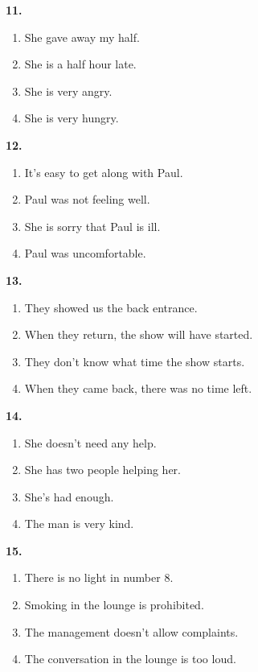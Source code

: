 \documentclass[12pt]{article}
\begin{document}
\par
\vspace{0.25\baselineskip}
\noindent\textbf{11.}
\begin{enumerate}[label=(\Alph*),leftmargin=*,itemsep=0.2em]
\item She gave away my half.
\item She is a half hour late.
\item She is very angry.
\item She is very hungry.
\end{enumerate}
\par
\vspace{0.25\baselineskip}
\noindent\textbf{12.}
\begin{enumerate}[label=(\Alph*),leftmargin=*,itemsep=0.2em]
\item It's easy to get along with Paul.
\item Paul was not feeling well.
\item She is sorry that Paul is ill.
\item Paul was uncomfortable.
\end{enumerate}
\par
\vspace{0.25\baselineskip}
\noindent\textbf{13.}
\begin{enumerate}[label=(\Alph*),leftmargin=*,itemsep=0.2em]
\item They showed us the back entrance.
\item When they return, the show will have started.
\item They don't know what time the show starts.
\item When they came back, there was no time left.
\end{enumerate}
\par
\vspace{0.25\baselineskip}
\noindent\textbf{14.}
\begin{enumerate}[label=(\Alph*),leftmargin=*,itemsep=0.2em]
\item She doesn't need any help.
\item She has two people helping her.
\item She's had enough.
\item The man is very kind.
\end{enumerate}
\par
\vspace{0.25\baselineskip}
\noindent\textbf{15.}
\begin{enumerate}[label=(\Alph*),leftmargin=*,itemsep=0.2em]
\item There is no light in number 8.
\item Smoking in the lounge is prohibited.
\item The management doesn't allow complaints.
\item The conversation in the lounge is too loud.
\end{enumerate}
\end{document}
